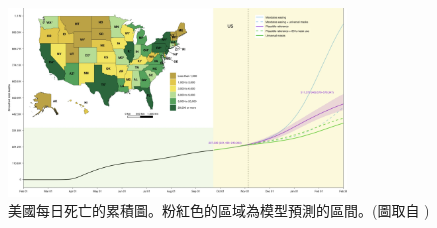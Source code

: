 
\begin{figure}[h]
    \centering
    \includegraphics[width=0.8\textwidth]{fig/modus_model/prediction.png}
    \caption{美國每日死亡的累積圖。粉紅色的區域為模型預測的區間。(圖取自 \citeauthor{modus2020})}
    \label{fig:death-pred}
\end{figure}